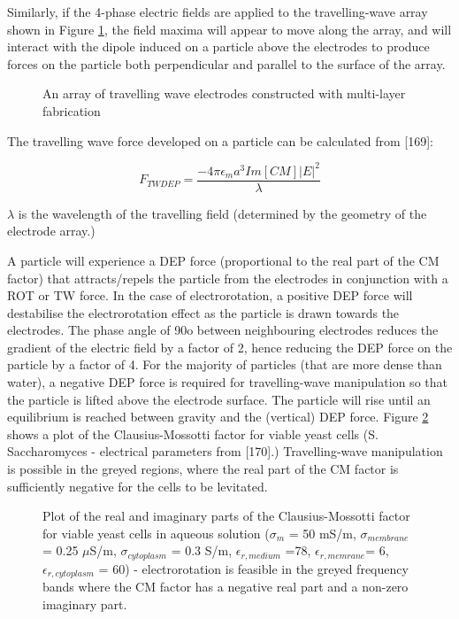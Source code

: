 Similarly, if the 4-phase electric fields are applied to the travelling-wave array shown in Figure \ref{fig:TWDEP_electrodes}, the field maxima will appear to move along the array, and will interact with the dipole induced on a particle above the electrodes to produce forces on the particle both perpendicular and parallel to the surface of the array.

\begin{figure}
 \centering
 \label{fig:TWDEP_electrodes}
 \caption{An array of travelling wave electrodes constructed with multi-layer fabrication}
\end{figure}

The travelling wave force developed on a particle can be calculated from [169]:

\begin{equation}
 F_{TWDEP} = \frac{-4\pi\epsilon_{m}a^{3} Im[CM] |E|^{2}}{\lambda}
\end{equation}

$\lambda$ is the wavelength of the travelling field (determined by the geometry of the electrode array.)

A particle will experience a DEP force (proportional to the real part of the CM factor) that attracts/repels the particle from the electrodes in conjunction with a ROT or TW force. In the case of electrorotation, a positive DEP force will destabilise the electrorotation effect as the particle is drawn towards the electrodes. The phase angle of 90o between neighbouring electrodes reduces the gradient of the electric field by a factor of 2, hence reducing the DEP force on the particle by a factor of 4. For the majority of particles (that are more dense than water), a negative DEP force is required for travelling-wave manipulation so that the particle is lifted above the electrode surface. The particle will rise until an equilibrium is reached between gravity and the (vertical) DEP force. Figure \ref{fig:CM_plot_viable_yeast} shows a plot of the Clausius-Mossotti factor for viable yeast cells (S. Saccharomyces - electrical parameters from [170].) Travelling-wave manipulation is possible in the greyed regions, where the real part of the CM factor is sufficiently negative for the cells to be levitated.

\begin{figure}
 \centering
 \caption{Plot of the real and imaginary parts of the Clausius-Mossotti factor for viable yeast cells in aqueous solution ($\sigma_{m}$ = 50 mS/m, $\sigma_{membrane}$ = 0.25 $\mu$S/m, $\sigma_{cytoplasm}$ = 0.3 S/m, $\epsilon_{r,medium}$ =78, $\epsilon_{r,memrane}$= 6, $\epsilon_{r,cytoplasm}$ = 60) - electrorotation is feasible in the greyed frequency bands where the CM factor has a negative real part and a non-zero imaginary part.}
 \label{fig:CM_plot_viable_yeast}
\end{figure}

